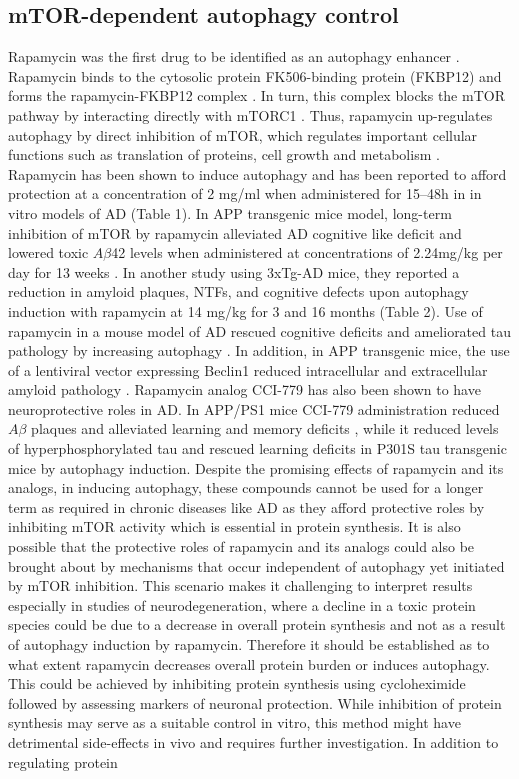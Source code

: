 \subsection{mTOR-dependent autophagy control}
Rapamycin was the first drug to be identified as an autophagy enhancer \citep{Blommaart1995,Noda1998}. Rapamycin binds to the cytosolic protein FK506-binding protein (FKBP12) and forms the rapamycin-FKBP12 complex \citep{Cardenas1995}. In turn, this complex blocks the mTOR pathway by interacting directly with mTORC1 \citep{Cardenas1995,Lorenz1995}. Thus, rapamycin up-regulates autophagy by direct inhibition of mTOR, which regulates important cellular functions such as translation of proteins, cell growth and metabolism \citep{Laplante2012,Polak2009}. Rapamycin has been shown to induce autophagy and has been reported to afford protection at a concentration of 2 mg/ml when administered for 15–48h in in vitro models of AD \citep{Berger2006} (Table 1). In APP transgenic mice model, long-term inhibition of mTOR by rapamycin alleviated AD cognitive like deficit and lowered toxic $A\beta$42 levels when administered at concentrations of 2.24mg/kg per day for 13 weeks \citep{Spilman2010}. In another study using 3xTg-AD mice, they reported a reduction in amyloid plaques, NTFs, and cognitive defects upon autophagy induction with rapamycin at 14 mg/kg for 3 and 16 months \citep{Majumder2011} (Table 2). Use of rapamycin in a mouse model of AD rescued cognitive deficits and ameliorated tau pathology by increasing autophagy \citep{Caccamo2010}. In addition, in APP transgenic mice, the use of a lentiviral vector expressing Beclin1 reduced intracellular and extracellular amyloid pathology \citep{Pickford2008}. Rapamycin analog CCI-779 has also been shown to have neuroprotective roles in AD. In APP/PS1 mice CCI-779 administration reduced $A\beta$ plaques and alleviated learning and memory deficits \citep{Jiang2014b}, while it reduced levels of hyperphosphorylated tau and rescued learning deficits in P301S tau transgenic mice \citep{Jiang2014a} by autophagy induction. Despite the promising effects of rapamycin and its analogs, in inducing autophagy, these compounds cannot be used for a longer term as required in chronic diseases like AD as they afford protective roles by inhibiting mTOR activity which is essential in protein synthesis. It is also possible that the protective roles of rapamycin and its analogs could also be brought about by mechanisms that occur independent of autophagy yet initiated by mTOR inhibition. This scenario makes it challenging to interpret results especially in studies of neurodegeneration, where a decline in a toxic protein species could be due to a decrease in overall protein synthesis and not as a result of autophagy induction by rapamycin. Therefore it should be established as to what extent rapamycin decreases overall protein burden or induces autophagy. This could be achieved by inhibiting protein synthesis using cycloheximide \citep{Watanabe-Asano2014} followed by assessing markers of neuronal protection. While inhibition of protein synthesis may serve as a suitable control in vitro, this method might have detrimental side-effects in vivo and requires further investigation. In addition to regulating protein 